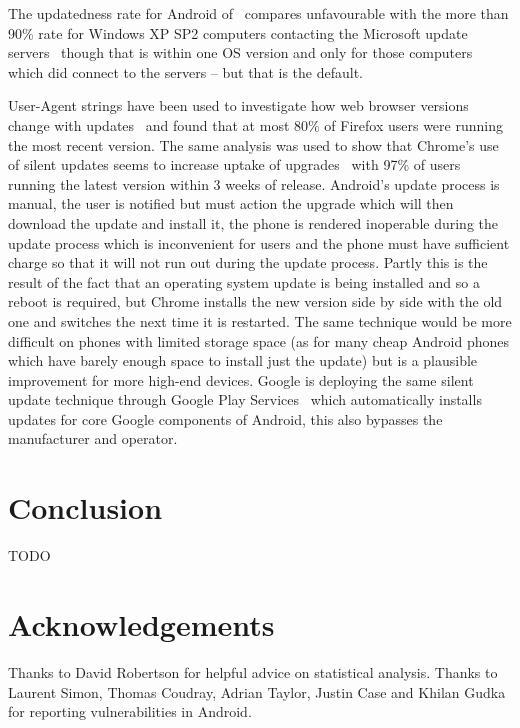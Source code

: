 \documentclass[conference,a4paper,twoside]{IEEEtran}
\begin{document}
The updatedness rate for Android of \daUpdatednessPerc\ compares unfavourable with the more than 90\% rate for Windows XP SP2 computers contacting the Microsoft update servers~\cite{Gkantsidis2006} though that is within one OS version and only for those computers which did connect to the servers -- but that is the default.

User-Agent strings have been used to investigate how web browser versions change with updates~\cite{Frei2008} and found that at most 80\% of Firefox users were running the most recent version.
The same analysis was used to show that Chrome's use of silent updates seems to increase uptake of upgrades~\cite{Duebendorfer2010} with 97\% of users running the latest version within 3 weeks of release.
Android's update process is manual, the user is notified but must action the upgrade which will then download the update and install it, the phone is rendered inoperable during the update process which is inconvenient for users and the phone must have sufficient charge so that it will not run out during the update process.
Partly this is the result of the fact that an operating system update is being installed and so a reboot is required, but Chrome installs the new version side by side with the old one and switches the next time it is restarted.
The same technique would be more difficult on phones with limited storage space (as for many cheap Android phones which have barely enough space to install just the update) but is a plausible improvement for more high-end devices.
Google is deploying the same silent update technique through Google Play Services~\cite{TODO} which automatically installs updates for core Google components of Android, this also bypasses the manufacturer and operator.



\section{Conclusion}
\label{sec:conclusion}
TODO

\section*{Acknowledgements}
Thanks to David Robertson for helpful advice on statistical analysis.
Thanks to Laurent Simon, Thomas Coudray, Adrian Taylor, Justin Case and Khilan Gudka for reporting vulnerabilities in Android.

\printbibliography
\end{document}
